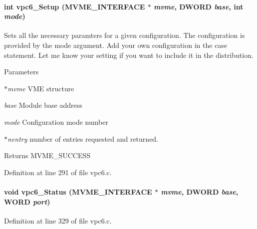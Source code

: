 \paragraph[{vpc6\_\-Setup}]{\setlength{\rightskip}{0pt plus 5cm}int vpc6\_\-Setup ({\bf MVME\_\-INTERFACE} $\ast$ {\em mvme}, \/  {\bf DWORD} {\em base}, \/  int {\em mode})}\hfill\label{vpc6_8c_a0bf11be8a7c2d0971e5c2bfb1387e36b}
Sets all the necessary paramters for a given configuration. The configuration is provided by the mode argument. Add your own configuration in the case statement. Let me know your setting if you want to include it in the distribution. 
\begin{DoxyParams}{Parameters}
\item[{\em $\ast$mvme}]VME structure \item[{\em base}]Module base address \item[{\em mode}]Configuration mode number \item[{\em $\ast$nentry}]number of entries requested and returned. \end{DoxyParams}
\begin{DoxyReturn}{Returns}
MVME\_\-SUCCESS 
\end{DoxyReturn}


Definition at line 291 of file vpc6.c.
\paragraph[{vpc6\_\-Status}]{\setlength{\rightskip}{0pt plus 5cm}void vpc6\_\-Status ({\bf MVME\_\-INTERFACE} $\ast$ {\em mvme}, \/  {\bf DWORD} {\em base}, \/  {\bf WORD} {\em port})}\hfill\label{vpc6_8c_adfab58684a7e747ca27b3cd175a5e294}


Definition at line 329 of file vpc6.c.